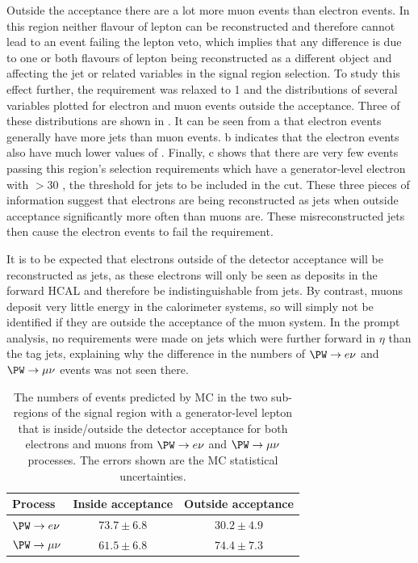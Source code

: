 Outside the acceptance there are a lot more muon events than electron events. In this region neither flavour of lepton can be reconstructed and therefore cannot lead to an event failing the lepton veto, which implies that any difference is due to one or both flavours of lepton being reconstructed as a different object and affecting the jet or \MET related variables in the signal region selection. To study this effect further, the \jetmetdphi requirement was relaxed to 1 and the distributions of several variables plotted for electron and muon events outside the acceptance. Three of these distributions are shown in . It can be seen from a that electron events generally have more jets than muon events. b indicates that the electron events also have much lower values of \jetmetdphi. Finally, c shows that there are very few events passing this region's selection requirements which have a generator-level electron with \pt$>30$ \GeV, the threshold for jets to be included in the \jetmetdphi cut. These three pieces of information suggest that electrons are being reconstructed as jets when outside acceptance significantly more often than muons are. These misreconstructed jets then cause the electron events to fail the \jetmetdphi requirement.

It is to be expected that electrons outside of the detector acceptance will be reconstructed as jets, as these electrons will only be seen as deposits in the forward \ac{HCAL} and therefore be indistinguishable from jets. By contrast, muons deposit very little energy in the calorimeter systems, so will simply not be identified if they are outside the acceptance of the muon system. In the prompt analysis, no requirements were made on jets which were further forward in $\eta$ than the tag jets, explaining why the difference in the numbers of $\PW\rightarrow e\nu$ and $\PW\rightarrow\mu\nu$ events was not seen there.

\begin{table}
  \caption{The numbers of events predicted by \ac{MC} in the two sub-regions of the signal region with a generator-level lepton that is inside/outside the detector acceptance for both electrons and muons from $\PW\rightarrow e\nu$ and $\PW\rightarrow\mu\nu$ processes. The errors shown are the \ac{MC} statistical uncertainties.}
  \label{tab:enumunudiff}
  \begin{tabular}{lcc}
    \hline
    \hline
    Process & Inside acceptance & Outside acceptance \\
    \hline
    $\PW\rightarrow e\nu$ & $73.7\pm 6.8$ & $30.2\pm 4.9$ \\
    $\PW\rightarrow \mu\nu$ & $61.5\pm 6.8$ & $74.4\pm7.3$ \\
    \hline
    \hline
  \end{tabular}
\end{table}


